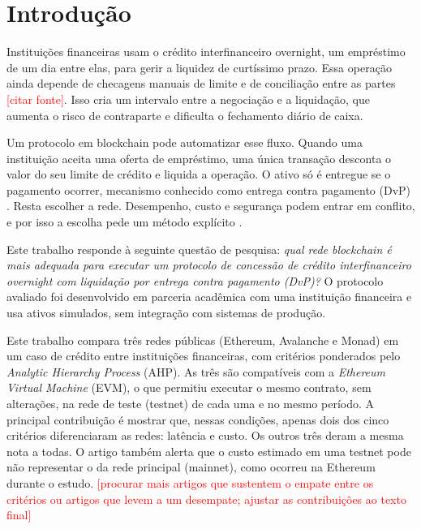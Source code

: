 \documentclass[10pt,a4paper]{article}
\newcommand{\pendente}[1]{\textcolor{red}{[#1]}}
\begin{document}
\section{Introdução}

Instituições financeiras usam o crédito interfinanceiro overnight, um empréstimo de um dia entre elas, para gerir a liquidez de curtíssimo prazo. Essa operação ainda depende de checagens manuais de limite e de conciliação entre as partes \pendente{citar fonte}. Isso cria um intervalo entre a negociação e a liquidação, que aumenta o risco de contraparte e dificulta o fechamento diário de caixa.

Um protocolo em blockchain pode automatizar esse fluxo. Quando uma instituição aceita uma oferta de empréstimo, uma única transação desconta o valor do seu limite de crédito e liquida a operação. O ativo só é entregue se o pagamento ocorrer, mecanismo conhecido como entrega contra pagamento (DvP) \cite{bis1992dvp,cpss2012pfmi}. Resta escolher a rede. Desempenho, custo e segurança podem entrar em conflito, e por isso a escolha pede um método explícito \cite{farshidi2020,baninemeh2023,six2020}.

Este trabalho responde à seguinte questão de pesquisa: \emph{qual rede blockchain é mais adequada para executar um protocolo de concessão de crédito interfinanceiro overnight com liquidação por entrega contra pagamento (DvP)?} O protocolo avaliado foi desenvolvido em parceria acadêmica com uma instituição financeira e usa ativos simulados, sem integração com sistemas de produção.

Este trabalho compara três redes públicas (Ethereum, Avalanche e Monad) em um caso de crédito entre instituições financeiras, com critérios ponderados pelo \emph{Analytic Hierarchy Process} (AHP). As três são compatíveis com a \emph{Ethereum Virtual Machine} (EVM), o que permitiu executar o mesmo contrato, sem alterações, na rede de teste (testnet) de cada uma e no mesmo período. A principal contribuição é mostrar que, nessas condições, apenas dois dos cinco critérios diferenciaram as redes: latência e custo. Os outros três deram a mesma nota a todas. O artigo também alerta que o custo estimado em uma testnet pode não representar o da rede principal (mainnet), como ocorreu na Ethereum durante o estudo. \pendente{procurar mais artigos que sustentem o empate entre os critérios ou artigos que levem a um desempate; ajustar as contribuições ao texto final}
\end{document}
